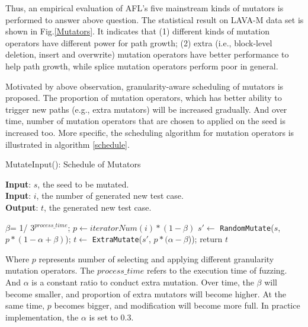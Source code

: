 Thus, an empirical evaluation of AFL's five mainstream kinds of mutators is performed to answer above question. The statistical result on LAVA-M data set is shown in Fig.\ref{Mutators}. It indicates that (1) different kinds of mutation operators have different power for path growth; (2) extra (i.e., block-level deletion, insert and overwrite) mutation operators have better performance to help path growth, while splice mutation operators perform poor in general.

Motivated by above observation, granularity-aware scheduling of mutators is proposed. The proportion of mutation operators, which has better ability to trigger new paths (e.g., extra mutators) will be increased gradually. And over time, number of mutation operators that are chosen to applied on the seed is increased too. More specific, the scheduling algorithm for mutation operators is illustrated in algorithm \ref{schedule}.

\begin{algorithm}[h]
\caption{MutateInput(): Schedule of Mutators} 
\label{schedule}
\hspace*{\algorithmicindent} \textbf{Input}:  $s$, the seed to be mutated. \\
\hspace*{\algorithmicindent} \textbf{Input}:  $i$, the number of generated new test case.\\
\hspace*{\algorithmicindent} \textbf{Output}: $t$, the generated new test case.

\begin{algorithmic}[1]
        \STATE $\beta$= 1/ 3$^{process\_time}$;
        \STATE $p \leftarrow iteratorNum(i) * (1 -\beta)$
        \STATE $s' \leftarrow$ \texttt{RandomMutate}($s$, $p*(1-\alpha + \beta)$);
        \STATE $t \leftarrow$ \texttt{ExtraMutate}($s'$, $p * (\alpha - \beta$));
        \STATE return $t$
\end{algorithmic}
\end{algorithm}

Where $p$ represents number of selecting and applying different granularity mutation operators. The $process\_time$ refers to the execution time of fuzzing. And $\alpha$ is a constant ratio to conduct extra mutation. Over time, the $\beta$ will become smaller, and proportion of extra mutators will become higher. At the same time, $p$ becomes bigger,  and modification will become more full. In practice implementation, the $\alpha$ is set to 0.3.



